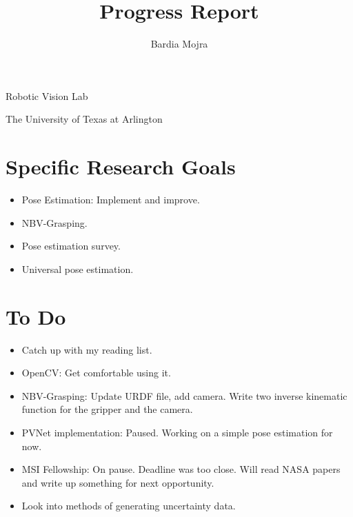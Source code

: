 \documentclass[11pt]{article}
\title{Progress Report}
\author{Bardia Mojra}
\begin{document}
\maketitle
\thispagestyle{empty}

\bigskip
\bigskip
\begin{center}
      Robotic Vision Lab
\end{center}

\begin{center}
      The University of Texas at Arlington
\end{center}

\newpage

\section{Specific Research Goals}
\begin{itemize}
      \item Pose Estimation: Implement and improve.
      \item NBV-Grasping.
      \item Pose estimation survey.
      \item Universal pose estimation.
\end{itemize}

\section{To Do}
\begin{itemize}
      \item Catch up with my reading list.
      \item OpenCV: Get comfortable using it.
      \item NBV-Grasping: Update URDF file, add camera. Write two inverse kinematic
      function for the gripper and the camera.
      \item PVNet implementation: Paused. Working on a simple pose estimation for now.
      \item MSI Fellowship: On pause. Deadline was too close. Will read NASA papers
      and write up something for next opportunity.
      \item Look into methods of generating uncertainty data.
\end{itemize}
\end{document}
